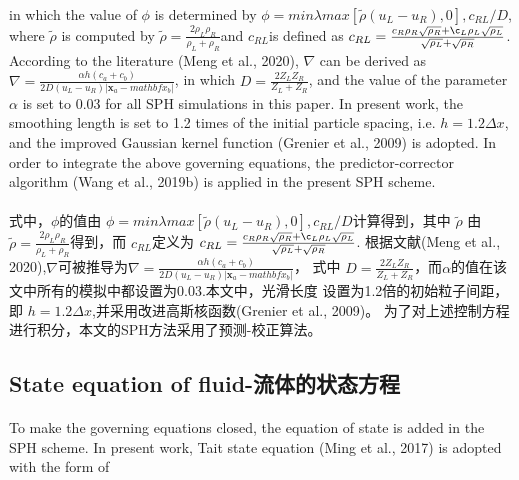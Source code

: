 \documentclass[UTF8]{ctexart}
\begin{document}
\paragraph{\quad}in which the value of $\phi$ is determined by $\phi = min{λmax[\tilde{ρ}(u_L-u_R), 0], c_{RL}/D}$, 
                 where $\tilde{\rho}$ is computed by $\tilde{ρ} = \frac{2 \rho_L \rho_R}{\rho_L + \rho_R} $and $c_{RL}$is defined as
                 $c_{RL} = \frac{c_R \rho_R \sqrt{\rho_R} + \c_L \rho_L \sqrt{\rho_L}}{\sqrt{\rho_L}+\sqrt{\rho_R}}$.
                 According to the literature (Meng et al., 2020), 
                 $\nabla$ can be derived as $\nabla =\frac{ \alpha h (c_a+c_b) }{2D(u_L-u_R)|\mathbf{x}_a-mathbf{x}_b|}$, 
                 in which $D = \frac{2Z_L Z_R}{Z_L + Z_R}$, and the value of the parameter $\alpha$ 
                 is set to 0.03 for all SPH simulations in this paper. 
                 In present work, the smoothing length is set to 1.2 times of the initial particle 
                 spacing, i.e. $h = 1.2 \Delta x$, and the improved Gaussian kernel function (Grenier et al., 2009) 
                 is adopted. In order to integrate the above governing equations, the predictor-corrector 
                 algorithm (Wang et al., 2019b) is applied in the present SPH scheme.
\paragraph{\quad}式中，$\phi$的值由 $\phi = min{λmax[\tilde{ρ}(u_L-u_R), 0], c_{RL}/D}$计算得到，其中 $\tilde{\rho}$
                由 $\tilde{ρ} = \frac{2 \rho_L \rho_R}{\rho_L + \rho_R} $得到，而 $c_{RL}$定义为
                $c_{RL} = \frac{c_R \rho_R \sqrt{\rho_R} + \c_L \rho_L \sqrt{\rho_L}}{\sqrt{\rho_L}+\sqrt{\rho_R}}$.
                根据文献(Meng et al., 2020),$\nabla$可被推导为$\nabla =\frac{ \alpha h (c_a+c_b) }{2D(u_L-u_R)|\mathbf{x}_a-mathbf{x}_b|}$，
                式中 $D = \frac{2Z_L Z_R}{Z_L + Z_R}$，而$\alpha$的值在该文中所有的模拟中都设置为0.03.本文中，光滑长度
                设置为1.2倍的初始粒子间距，即 $h = 1.2 \Delta x$,并采用改进高斯核函数(Grenier et al., 2009)。
                为了对上述控制方程进行积分，本文的SPH方法采用了预测-校正算法。


\subsection{State equation of fluid-流体的状态方程}
\paragraph{\quad}To make the governing equations closed, the equation of state is added
                in the SPH scheme. In present work, Tait state equation (Ming et al., 2017) 
                is adopted with the form of
\end{document}
